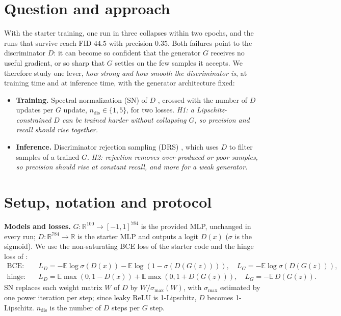 \documentclass[10pt,a4paper]{article}
\newcommand{\ndis}{n_{\mathrm{dis}}}
\begin{document}
\section{Question and approach}
With the starter training, one run in three collapses within two epochs, and the runs that survive reach FID $44.5$ with precision $0.35$. Both failures point to the discriminator $D$: it can become so confident that the generator $G$ receives no useful gradient, or so sharp that $G$ settles on the few samples it accepts. We therefore study one lever, \emph{how strong and how smooth the discriminator is}, at training time and at inference time, with the generator architecture fixed:
\begin{itemize}
\item \textbf{Training.} Spectral normalization (SN) of $D$ \cite{miyato2018}, crossed with the number of $D$ updates per $G$ update, $\ndis\in\{1,5\}$, for two losses. \emph{H1: a Lipschitz-constrained $D$ can be trained harder without collapsing $G$, so precision and recall should rise together.}
\item \textbf{Inference.} Discriminator rejection sampling (DRS) \cite{azadi2019}, which uses $D$ to filter samples of a trained $G$. \emph{H2: rejection removes over-produced or poor samples, so precision should rise at constant recall, and more for a weak generator.}
\end{itemize}

\section{Setup, notation and protocol}
\textbf{Models and losses.} $G:\mathbb{R}^{100}\to[-1,1]^{784}$ is the provided MLP, unchanged in every run; $D:\mathbb{R}^{784}\to\mathbb{R}$ is the starter MLP and outputs a logit $D(x)$ ($\sigma$ is the sigmoid). We use the non-saturating BCE loss of the starter code and the hinge loss of \cite{miyato2018,lim2017}:
\begin{align*}
\text{BCE:}\quad & L_D=-\mathbb{E}\log\sigma(D(x))-\mathbb{E}\log(1-\sigma(D(G(z)))),\quad L_G=-\mathbb{E}\log\sigma(D(G(z))),\\
\text{hinge:}\quad & L_D=\mathbb{E}\max(0,1-D(x))+\mathbb{E}\max(0,1+D(G(z))),\quad L_G=-\mathbb{E}\,D(G(z)).
\end{align*}
SN replaces each weight matrix $W$ of $D$ by $W/\sigma_{\max}(W)$, with $\sigma_{\max}$ estimated by one power iteration per step; since leaky ReLU is 1-Lipschitz, $D$ becomes 1-Lipschitz. $\ndis$ is the number of $D$ steps per $G$ step.
\end{document}
